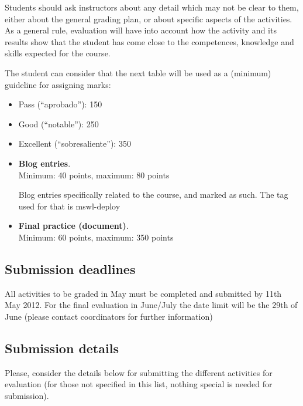 \documentclass[a4paper]{article}
\begin{document}
Students should ask instructors about any detail which may not be
clear to them, either about the general grading plan, or about
specific aspects of the activities. As a general rule, evaluation will
have into account how the activity and its results show that the
student has come close to the competences, knowledge and skills
expected for the course.

The student can consider that the next table will be used as a
(minimum) guideline for assigning marks:

\begin{itemize}
\item Pass (``aprobado''): 150
\item Good (``notable''): 250
\item Excellent (``sobresaliente''): 350
\end{itemize}

\begin{itemize}
\item \textbf{Blog entries}. \\
  Minimum: 40 points, maximum: 80 points

  Blog entries specifically related to the course, and marked as such. The tag used for that is mswl-deploy


\item \textbf{Final practice (document)}. \\
  Minimum: 60 points, maximum: 350 points



\end{itemize}

\subsection{Submission deadlines}

All activities to be graded in May must be completed and submitted by 11th May 2012. For the final evaluation in June/July the date limit will be the 29th of June (please contact coordinators for further information)

\subsection{Submission details}

Please, consider the details below for submitting the different activities for evaluation (for those not specified in this list, nothing special is needed for submission).
\end{document}
